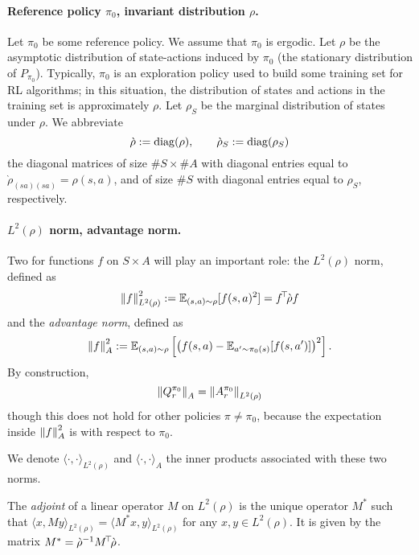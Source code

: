 \documentclass[11pt,a4paper]{article}
\newcommand{\drho}{\grave \rho}
\begin{document}
\paragraph{Reference policy $\pi_0$, invariant distribution $\rho$.} Let $\pi_0$ be some reference policy.
We assume
that $\pi_0$ is ergodic. Let $\rho$ be the asymptotic distribution of
state-actions induced by $\pi_0$ (the stationary distribution of
$P_{\pi_0}$). Typically, $\pi_0$ is an exploration policy used to build
some training set for RL algorithms; in this situation, the distribution
of states and actions in the training set is approximately $\rho$.
Let $\rho_S$ be the marginal distribution of states under $\rho$.
We abbreviate
\begin{equation}
\drho \deq \diag(\rho),\qquad \drho_S\deq \diag(\rho_S)
\end{equation}
the diagonal matrices of size $\#S\times \#A$ with diagonal entries equal
to $\drho_{(sa)(sa)}=\rho(s,a)$, and of size $\#S$ with diagonal entries
equal to $\rho_S$, respectively.

\paragraph{$L^2(\rho)$ norm, advantage norm.} Two
for functions $f$ on
$S\times A$ will play an important role: the $L^2(\rho)$ norm, defined as
\begin{equation}
\norm{f}^2_{L^2(\rho)}\deq\E_{(s,a)\sim \rho} [f(s,a)^2]=\transp{f}\drho f
\end{equation}
and the \emph{advantage norm}, defined as
\begin{equation}
\left\lVert f\right\rVert^2_A\mathrel{\mathop{:}}= \mathbb{E}_{(s,a)\sim \rho}\left[\left(
f(s,a)-\mathbb{E}_{a'\sim \pi_0(s)} [f(s,a')]
\right)^2\right].
\end{equation}
By construction,
\begin{equation}
\left\lVert Q^{\pi_0}_r\right\rVert_A=\left\lVert A^{\pi_0}_r\right\rVert_{L^2(\rho)}
\end{equation}
though this does not hold for other policies $\pi\neq \pi_0$, because
the expectation inside $\left\lVert f\right\rVert^2_A$ is with respect to $\pi_0$.

We denote $\langle\cdot,\cdot\rangle_{L^2(\rho)}$ and
$\langle\cdot,\cdot\rangle_A$ the inner products associated
with these two norms.

The \emph{adjoint} of a linear operator $M$ on $L^2(\rho)$ is the unique
operator $M^\ast$ such that $\langle x,My\rangle_{L^2(\rho)}=\langle
M^\ast x,y\rangle_{L^2(\rho)}$ for any $x,y\in L^2(\rho)$. It is given by
the matrix $M^\ast=\drho^{-1} \transp{M}\drho$.
\end{document}
